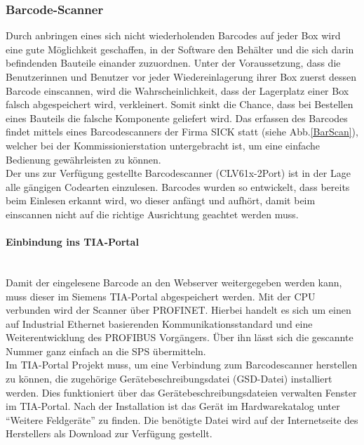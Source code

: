 \subsubsection{Barcode-Scanner}
Durch anbringen eines sich nicht wiederholenden Barcodes auf jeder Box wird eine gute Möglichkeit geschaffen, in der Software den Behälter und die sich darin befindenden Bauteile einander zuzuordnen. Unter der Voraussetzung, dass die Benutzerinnen und Benutzer vor jeder Wiedereinlagerung ihrer Box zuerst dessen Barcode einscannen, wird die Wahrscheinlichkeit, dass der Lagerplatz einer Box falsch abgespeichert wird, verkleinert. Somit sinkt die Chance, dass bei Bestellen eines Bauteils die falsche Komponente geliefert wird. Das erfassen des Barcodes findet mittels eines Barcodescanners der Firma SICK statt (siehe Abb.\ref{BarScan}), welcher bei der Kommissionierstation untergebracht ist, um eine einfache Bedienung gewährleisten zu können.\\
Der uns zur Verfügung gestellte Barcodescanner (CLV61x-2Port) ist in der Lage alle gängigen Codearten einzulesen.\cite{Barcodescanner} Barcodes wurden so entwickelt, dass bereits beim Einlesen erkannt wird, wo dieser anfängt und aufhört, damit beim einscannen nicht auf die richtige Ausrichtung geachtet werden muss.



\paragraph{Einbindung ins TIA-Portal \cite{BarScan_Handbuch}}\mbox{}\\
Damit der eingelesene Barcode an den Webserver weitergegeben werden kann, muss dieser im Siemens TIA-Portal abgespeichert werden. Mit der CPU verbunden wird der Scanner über PROFINET. Hierbei handelt es sich um einen auf Industrial Ethernet basierenden Kommunikationsstandard und eine Weiterentwicklung des PROFIBUS Vorgängers. Über ihn lässt sich die gescannte Nummer ganz einfach an die SPS übermitteln.\\
Im TIA-Portal Projekt muss, um eine Verbindung zum Barcodescanner herstellen zu können, die zugehörige Gerätebeschreibungsdatei (GSD-Datei) installiert werden. Dies funktioniert über das Gerätebeschreibungsdateien verwalten Fenster im TIA-Portal. Nach der Installation ist das Gerät im Hardwarekatalog unter \enquote{Weitere Feldgeräte} zu finden. Die benötigte Datei wird auf der Internetseite des Herstellers als Download zur Verfügung gestellt.

